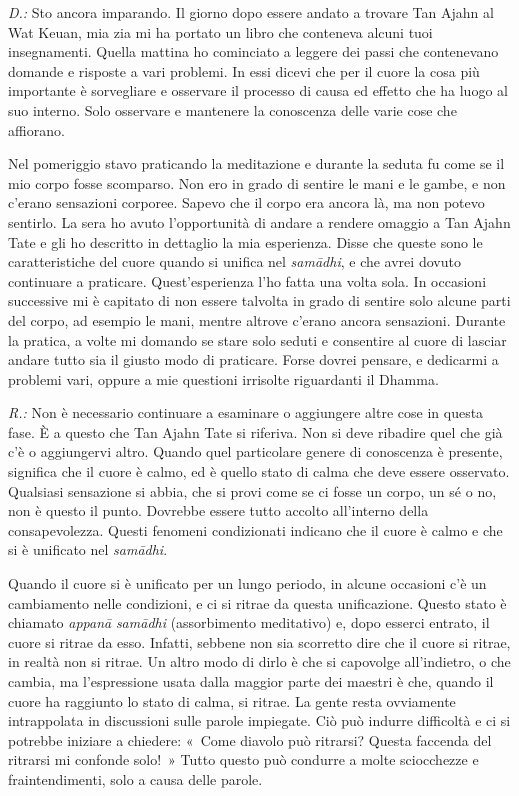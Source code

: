 \emph{D.:} Sto ancora imparando. Il giorno dopo essere andato a trovare Tan
Ajahn al Wat Keuan, mia zia mi ha portato un libro che conteneva alcuni
tuoi insegnamenti. Quella mattina ho cominciato a leggere dei passi che
contenevano domande e risposte a vari problemi. In essi dicevi che per
il cuore la cosa più importante è sorvegliare e osservare il processo di
causa ed effetto che ha luogo al suo interno. Solo osservare e mantenere
la conoscenza delle varie cose che affiorano.

Nel pomeriggio stavo praticando la meditazione e durante la seduta fu
come se il mio corpo fosse scomparso. Non ero in grado di sentire le
mani e le gambe, e non c'erano sensazioni corporee. Sapevo che il corpo
era ancora là, ma non potevo sentirlo. La sera ho avuto l'opportunità di
andare a rendere omaggio a Tan Ajahn Tate e gli ho descritto in
dettaglio la mia esperienza. Disse che queste sono le caratteristiche
del cuore quando si unifica nel \emph{samādhi}, e che avrei dovuto
continuare a praticare. Quest'esperienza l'ho fatta una volta sola. In
occasioni successive mi è capitato di non essere talvolta in grado di
sentire solo alcune parti del corpo, ad esempio le mani, mentre altrove
c'erano ancora sensazioni. Durante la pratica, a volte mi domando se
stare solo seduti e consentire al cuore di lasciar andare tutto sia il
giusto modo di praticare. Forse dovrei pensare, e dedicarmi a problemi
vari, oppure a mie questioni irrisolte riguardanti il Dhamma.

\emph{R.:} Non è necessario continuare a esaminare o aggiungere altre cose in
questa fase. È a questo che Tan Ajahn Tate si riferiva. Non si deve
ribadire quel che già c'è o aggiungervi altro. Quando quel particolare
genere di conoscenza è presente, significa che il cuore è calmo, ed è
quello stato di calma che deve essere osservato. Qualsiasi sensazione si
abbia, che si provi come se ci fosse un corpo, un sé o no, non è questo
il punto. Dovrebbe essere tutto accolto all'interno della
consapevolezza. Questi fenomeni condizionati indicano che il cuore è
calmo e che si è unificato nel \emph{samādhi}.

Quando il cuore si è unificato per un lungo periodo, in alcune occasioni
c'è un cambiamento nelle condizioni, e ci si ritrae da questa
unificazione. Questo stato è chiamato \emph{appanā} \emph{samādhi}
(assorbimento meditativo) e, dopo esserci entrato, il cuore si ritrae da
esso. Infatti, sebbene non sia scorretto dire che il cuore si ritrae, in
realtà non si ritrae. Un altro modo di dirlo è che si capovolge
all'indietro, o che cambia, ma l'espressione usata dalla maggior parte
dei maestri è che, quando il cuore ha raggiunto lo stato di calma, si
ritrae. La gente resta ovviamente intrappolata in discussioni sulle
parole impiegate. Ciò può indurre difficoltà e ci si potrebbe iniziare a
chiedere: «~Come diavolo può ritrarsi? Questa faccenda del ritrarsi mi
confonde solo!~» Tutto questo può condurre a molte sciocchezze e
fraintendimenti, solo a causa delle parole.

